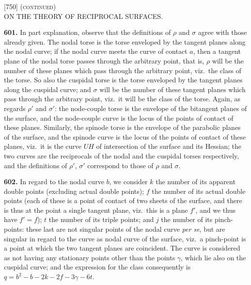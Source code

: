 \documentclass[11pt,a4paper]{article}
\newcommand{\artno}[1]{\textbf{#1.}\quad}
\begin{document}

\begin{center}
\textsc{[750] (continued)}\\[2pt]
\textsc{ON THE THEORY OF RECIPROCAL SURFACES.}
\end{center}

\bigskip

\noindent
\artno{601} In part explanation, observe that the definitions of $\rho$ and
$\sigma$ agree with those already given. The nodal torse is the torse
enveloped by the tangent planes along the nodal curve; if the nodal curve
meets the curve of contact $a$, then a tangent plane of the nodal torse passes
through the arbitrary point, that is, $\rho$ will be the number of these
planes which pass through the arbitrary point, viz.\ the class of the torse.
So also the cuspidal torse is the torse enveloped by the tangent planes along
the cuspidal curve; and $\sigma$ will be the number of these tangent planes
which pass through the arbitrary point, viz.\ it will be the class of the
torse. Again, as regards $\rho'$ and $\sigma'$: the node-couple torse is the
envelope of the bitangent planes of the surface, and the node-couple curve is
the locus of the points of contact of these planes. Similarly, the spinode
torse is the envelope of the parabolic planes of the surface, and the spinode
curve is the locus of the points of contact of these planes, viz.\ it is the
curve $UH$ of intersection of the surface and its Hessian; the two curves are
the reciprocals of the nodal and the cuspidal torses respectively, and the
definitions of $\rho'$, $\sigma'$ correspond to those of $\rho$ and $\sigma$.

\medskip

\artno{602} In regard to the nodal curve $b$, we consider $k$ the number of
its apparent double points (excluding actual double points); $f$ the number of
its actual double points (each of these is a point of contact of two sheets of
the surface, and there is thus at the point a single tangent plane, viz.\
this is a plane $f'$, and we thus have $f' = f$); $t$ the number of its
triple points; and $j$ the number of its pinch-points: these last are not
singular points of the nodal curve \emph{per se}, but are singular in regard
to the curve as nodal curve of the surface, viz.\ a pinch-point is a point at
which the two tangent planes are coincident.  The curve is considered as not
having any stationary points other than the points $\gamma$, which lie also
on the cuspidal curve; and the expression for the class consequently is
$q = b^{2} - b - 2k - 2f - 3\gamma - 6t$.
\end{document}
